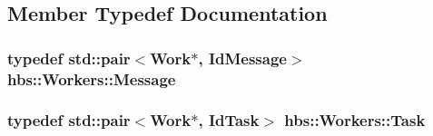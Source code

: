 \subsection{Member Typedef Documentation}
\hypertarget{classhbs_1_1_workers_addd8065047a1fa376581419ffcda0685}{
\subsubsection[{Message}]{\setlength{\rightskip}{0pt plus 5cm}typedef std\-::pair$<${\bf Work}$\ast$, {\bf Id\-Message}$>$ {\bf hbs\-::\-Workers\-::\-Message}}}\label{classhbs_1_1_workers_addd8065047a1fa376581419ffcda0685}
\hypertarget{classhbs_1_1_workers_a451e0985676c46558a1114b12dd96916}{
\subsubsection[{Task}]{\setlength{\rightskip}{0pt plus 5cm}typedef std\-::pair$<${\bf Work}$\ast$, {\bf Id\-Task}$>$ {\bf hbs\-::\-Workers\-::\-Task}}}\label{classhbs_1_1_workers_a451e0985676c46558a1114b12dd96916}


